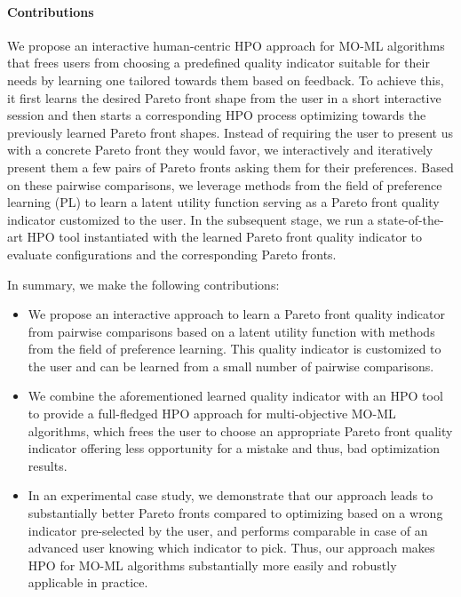 \paragraph{Contributions} We propose an interactive human-centric HPO \cite{pfisterer-arxiv2019a,souza-ecmlpkdd21a,moosbauer-neurips21a,hvarfner-iclr22a,moosbauer-arxiv22a,segel-automl23a,mallik-arxiv23} approach for MO-ML algorithms that frees users from choosing a predefined quality indicator suitable for their needs by learning one tailored towards them based on feedback.
To achieve this, it first learns the desired Pareto front shape from the user in a short interactive session and then starts a corresponding HPO process optimizing towards the previously learned Pareto front shapes.
Instead of requiring the user to present us with a concrete Pareto front they would favor, we interactively and iteratively present them a few pairs of Pareto fronts asking them for their preferences.
Based on these pairwise comparisons, we leverage methods from the field of preference learning (PL) \cite{furnkranz-plbook10a} to learn a latent utility function serving as a Pareto front quality indicator customized to the user.
In the subsequent stage, we run a state-of-the-art HPO tool
instantiated with the learned Pareto front quality indicator to evaluate configurations and the corresponding Pareto fronts.

In summary, we make the following contributions:
\begin{itemize}
    \item We propose an interactive approach to learn a Pareto front quality indicator from pairwise comparisons based on a latent utility function with methods from the field of preference learning. This quality indicator is customized to the user and can be learned from a small number of pairwise comparisons. 
    \item We combine the aforementioned learned quality indicator with an HPO tool 
    to provide a full-fledged HPO approach for multi-objective MO-ML algorithms, which frees the user to choose an appropriate Pareto front quality indicator offering less opportunity for a mistake and thus, bad optimization results.
    \item In an experimental case study, we demonstrate that our approach leads to substantially better Pareto fronts compared to optimizing based on a wrong indicator pre-selected by the user, and performs comparable in case of an advanced user knowing which indicator to pick. Thus, our approach makes HPO for MO-ML algorithms substantially more easily and robustly applicable in practice.
\end{itemize}

